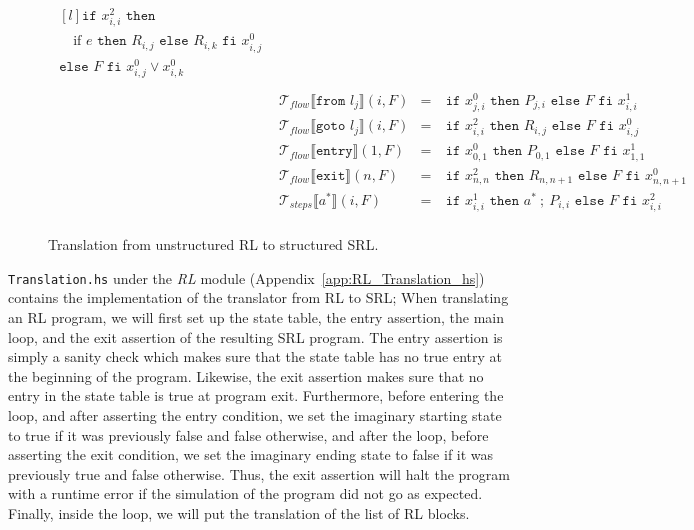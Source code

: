 \begin{figure}
$$\begin{aligned}
      \begin{matrix*}[l]
        \texttt{if }x_{i,i}^2\texttt{ then}\\
        \quad\text{if }e\texttt{ then }R_{i,j}\texttt{ else }R_{i,k}\texttt{ fi }x_{i,j}^0\\
        \texttt{else }F\texttt{ fi }x_{i,j}^0\lor x_{i,k}^0\\
      \end{matrix*}\\
    & \mathcal{T}_{flow}\llbracket\texttt{from }l_j\rrbracket(i,F) & =\ & \texttt{if }x_{j,i}^0\texttt{ then }P_{j,i}\texttt{ else }F\texttt{ fi }x_{i,i}^1\\
    & \mathcal{T}_{flow}\llbracket\texttt{goto }l_j\rrbracket(i,F) & =\ & \texttt{if }x_{i,i}^2\texttt{ then }R_{i,j}\texttt{ else }F\texttt{ fi }x_{i,j}^0\\
    & \mathcal{T}_{flow}\llbracket\texttt{entry}\rrbracket(1,F)    & =\ & \texttt{if }x_{0,1}^0\texttt{ then }P_{0,1}\texttt{ else }F\texttt{ fi }x_{1,1}^1\\
    & \mathcal{T}_{flow}\llbracket\texttt{exit}\rrbracket(n,F)     & =\ & \texttt{if }x_{n,n}^2\texttt{ then }R_{n,n+1}\texttt{ else }F\texttt{ fi }x_{n,n+1}^0\\
    & \mathcal{T}_{steps}\llbracket a^*\rrbracket(i,F)     & =\ & \texttt{if }x_{i,i}^1\texttt{ then }a^*\ ;\ P_{i,i}\texttt{ else }F\texttt{ fi }x_{i,i}^2\\
  \end{aligned}$$
  \caption{Translation from unstructured RL to structured SRL.}
  \label{fig:translation_rl_to_srl}
\end{figure}
\texttt{Translation.hs} under the \textit{RL} module (Appendix~\ref{app:RL_Translation_hs}) contains the implementation of the translator from RL to SRL; When translating an RL program, we will first set up the state table, the entry assertion, the main loop, and the exit assertion of the resulting SRL program. The entry assertion is simply a sanity check which makes sure that the state table has no true entry at the beginning of the program. Likewise, the exit assertion makes sure that no entry in the state table is true at program exit. Furthermore, before entering the loop, and after asserting the entry condition, we set the imaginary starting state to true if it was previously false and false otherwise, and after the loop, before asserting the exit condition, we set the imaginary ending state to false if it was previously true and false otherwise. Thus, the exit assertion will halt the program with a runtime error if the simulation of the program did not go as expected. Finally, inside the loop, we will put the translation of the list of RL blocks.

